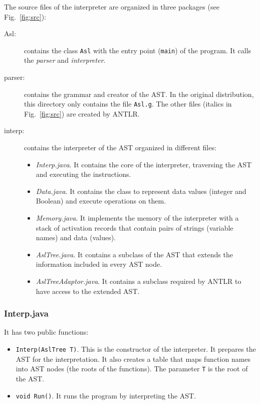 The source files of the interpreter are organized in three packages
(see Fig.~\ref{fig:src}):
\begin{description}
 \item [Asl:] contains the class \texttt{Asl} with the entry point
(\texttt{main}) of the program. It calls the \emph{parser} and
\emph{interpreter}.
\item [parser:] contains the grammar and creator of the AST.
In the original distribution, this directory only contains the file
\texttt{Asl.g}. The other files (italics in Fig.~\ref{fig:src}) are
created by ANTLR.
\item [interp:] contains the interpreter of the AST organized in different
files:
\begin{itemize}
 \item \emph{Interp.java}. It contains the core of the interpreter,
traversing the AST and executing the instructions.
\item \emph{Data.java}. It contains the class to represent data values
(integer and Boolean) and execute operations on them.
\item \emph{Memory.java}. It implements the memory of the interpreter with a
stack of activation records that contain pairs of strings (variable names)
and data (values).
\item \emph{AslTree.java}. It contains a subclass of the AST that extends the
information included in every AST node.
\item \emph{AslTreeAdaptor.java}. It contains a subclass required by ANTLR to
have access to the extended AST.
\end{itemize}
\end{description}

\subsubsection{Interp.java}

It has two public functions:
\begin{itemize}
 \item \texttt{Interp(AslTree T)}. This is the constructor of the
interpreter. It prepares the AST for the interpretation. It also creates a
table that maps function names into AST nodes (the roots of the functions).
The parameter \texttt{T} is the root of the AST.

\item \texttt{void Run()}. It runs the program by interpreting the AST.
\end{itemize}

